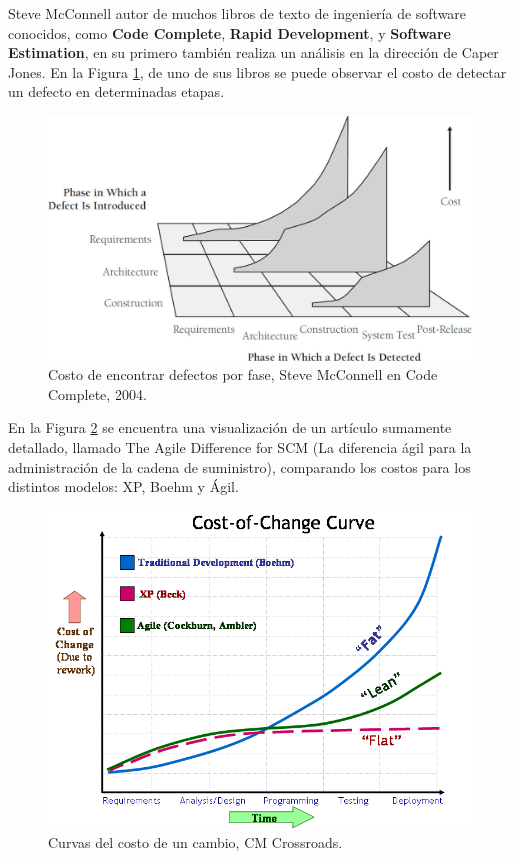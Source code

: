 Steve McConnell autor de muchos libros de texto de ingeniería de software conocidos, como \textbf{Code Complete}\cite{mcconnell2004code}, \textbf{Rapid Development}\cite{mcconnell1996rapid}, y \textbf{Software Estimation}\cite{mcconnell2006software}, en su primero también realiza un análisis en la dirección de Caper Jones. En la Figura \ref{fig:defect cost increase}, de uno de sus libros se puede observar el costo de detectar un defecto en determinadas etapas.

\begin{figure}[h]
    \centering
    \includegraphics[scale=0.3]{images/DefectCostIncrease2004.jpg}
    \caption{Costo de encontrar defectos por fase, Steve McConnell en Code Complete, 2004.}
    \label{fig:defect cost increase}
\end{figure}

En la Figura \ref{fig:cost-of-change curve} se encuentra una visualización de un artículo sumamente detallado, llamado The Agile Difference for SCM\cite{TheAgileDifference} (La diferencia ágil para la administración de la cadena de suministro), comparando los costos para los distintos modelos: XP, Boehm y Ágil.

\begin{figure}[h]
    \centering
    \includegraphics[scale=0.5]{images/TheAgileDifference.png}
    \caption{Curvas del costo de un cambio, CM Crossroads.}
    \label{fig:cost-of-change curve}
\end{figure}

